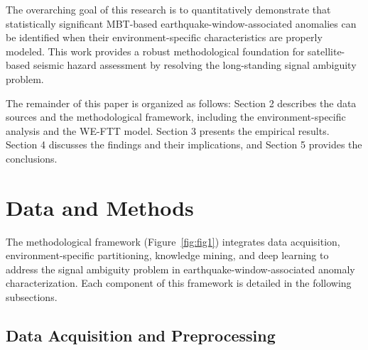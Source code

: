 \documentclass[preprint,review,12pt,authoryear]{elsarticle}
\begin{document}
The overarching goal of this research is to quantitatively demonstrate that statistically significant MBT-based earthquake-window-associated anomalies can be identified when their environment-specific characteristics are properly modeled. This work provides a robust methodological foundation for satellite-based seismic hazard assessment by resolving the long-standing signal ambiguity problem.

The remainder of this paper is organized as follows: Section 2 describes the data sources and the methodological framework, including the environment-specific analysis and the WE-FTT model. Section 3 presents the empirical results. Section 4 discusses the findings and their implications, and Section 5 provides the conclusions.

\section{Data and Methods}\label{sec:data_methods}

The methodological framework (Figure~\ref{fig:fig1}) integrates data acquisition, environment-specific partitioning, knowledge mining, and deep learning to address the signal ambiguity problem in earthquake-window-associated anomaly characterization. Each component of this framework is detailed in the following subsections.

\subsection{Data Acquisition and Preprocessing}\label{sec:data_acquisition}
\end{document}
